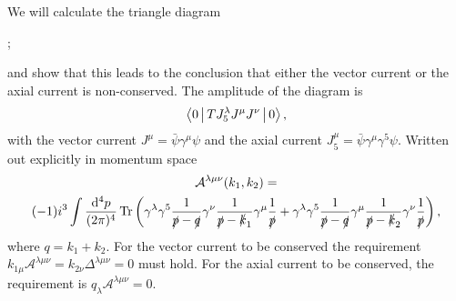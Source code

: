 We will calculate the triangle diagram
\begin{center}
  ;
\end{center}
and show that this leads to the conclusion that either the vector current or the axial current is non-conserved.
The amplitude of the diagram is
\begin{equation}
  \Braket{0|
    T J_5^{\lambda} J^{\mu} J^{\nu}|
  0},
\end{equation}
with the vector current $J^{\mu }= \bar{\psi} \gamma ^{\mu } \psi $ and the axial current $J_5^{\mu } = \bar{\psi} \gamma ^{\mu } \gamma ^5\psi $.
Written out explicitly in momentum space
\begin{multline}
  \label{eq:amplitude}
  \mathcal{A}^{\lambda \mu \nu}(k_1, k_2) =\\
  (-1) i^3 \int \frac{\mathrm{d}^4p}{(2 \pi)^{4}}
  \operatorname{Tr}\left(
    \gamma^{\lambda}\gamma^5 \frac{1}{\slashed{p} - \slashed{q}}
    \gamma^{\nu} \frac{1}{\slashed{p} - \slashed{k}_{1}}
    \gamma ^{\mu} \frac{1}{\slashed{p}}
    +
    \gamma ^{\lambda}\gamma^5 \frac{1}{\slashed{p} - \slashed{q}}
    \gamma ^{\mu } \frac{1}{\slashed{p} -\slashed{k}_{2}}
    \gamma ^{\nu } \frac{1}{\slashed{p}}
  \right),
\end{multline}
where $q = k_1 + k_2$.
For the vector current to be conserved the requirement $k_{1\mu }\mathcal{A} ^{\lambda \mu \nu } = k_{2\nu }\Delta ^{\lambda \mu \nu } = 0$ must hold.
For the axial current to be conserved, the requirement is $q_{\lambda }\mathcal{A}^{\lambda \mu \nu } = 0$.

